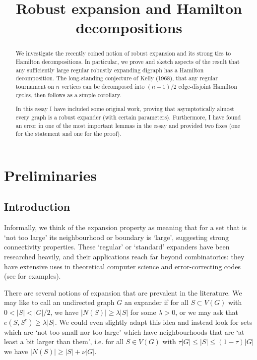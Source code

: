 \documentclass[10pt,letterpaper, reqno]{amsart}
\theoremstyle{definition}
\numberwithin{equation}{section}
\begin{document}
\title{Robust expansion and Hamilton decompositions}
\maketitle


\begin{abstract}
	We investigate the recently coined notion of robust expansion and its strong ties to Hamilton decompositions. In particular, we prove and sketch aspects of the result that any sufficiently large regular robustly expanding digraph has a Hamilton decomposition. The long-standing conjecture of Kelly (1968), that any regular tournament on $n$ vertices can be decomposed into $(n-1)/2$ edge-disjoint Hamilton cycles, then follows as a simple corollary.	
	
	In this essay I have included some original work, proving that asymptotically almost every graph is a robust expander (with certain parameters). Furthermore, I have found an error in one of the most important lemmas in the essay and provided two fixes (one for the statement and one for the proof). 
\end{abstract}


\section{Preliminaries}

\subsection{Introduction}
Informally, we think of the expansion property as meaning that for a set that is `not too large' its neighbourhood or boundary is `large', suggesting strong connectivity properties. These `regular' or `standard' expanders have been researched heavily, and their applications reach far beyond combinatorics: they have extensive uses in theoretical computer science and error-correcting codes (see \cite{ExpanderBook} for examples). 

There are several notions of expansion that are prevalent in the literature. We may like to call an undirected graph $G$ an expander if for all $S \subset V(G)$ with $0 < |S| <|G|/2$, we have $|N(S)| \geq \lambda|S|$ for some $\lambda >0$, or we may ask that $e(S, S^c) \geq \lambda |S|$. We could even slightly adapt this idea and instead look for sets which are `not too small nor too large' which have neighbourhoods that are `at least a bit larger than them', i.e. for  all $S \in V(G)$ with $\tau |G| \leq |S| \leq (1-\tau)|G|$ we have $|N(S)| \geq |S| + \nu |G|$. 
\end{document}

